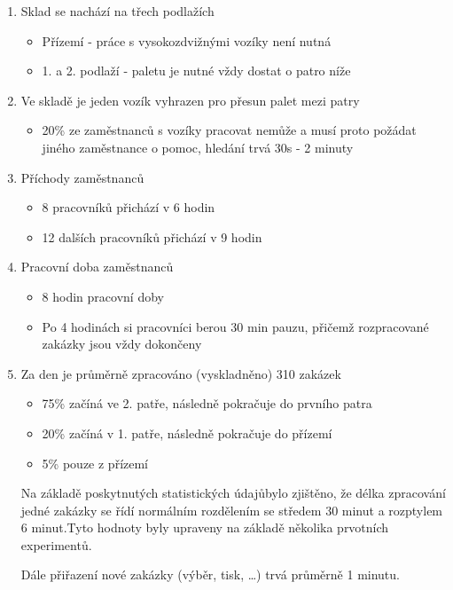 \documentclass[11pt]{article}
\begin{document}
	\begin{enumerate}
		\item Sklad se nachází na třech podlažích\footnotemark[1]
		\begin{itemize}
			\item \textsf{Přízemí} - práce s vysokozdvižnými vozíky není nutná
			\item \textsf{1. a 2. podlaží} - paletu je nutné vždy dostat o patro níže
		\end{itemize}
		\item Ve skladě je jeden vozík vyhrazen pro přesun palet mezi patry\footnotemark[1]
		\begin{itemize}
			\item \textsf{20\%} ze zaměstnanců s vozíky pracovat nemůže a musí proto požádat jiného zaměstnance o pomoc, hledání trvá \textsf{30s - 2 minuty}\footnotemark[1]
		\end{itemize}
		\item Příchody zaměstnanců\footnotemark[2]
		\begin{itemize}
			\item \textsf{8} pracovníků přichází v 6 hodin
			\item \textsf{12} dalších pracovníků přichází v 9 hodin
		\end{itemize}
		\item Pracovní doba zaměstnanců\footnotemark[2]
		\begin{itemize}
			\item \textsf{8 hodin} pracovní doby
			\item Po \textsf{4 hodinách} si pracovníci berou \textsf{30 min} pauzu, přičemž rozpracované zakázky jsou vždy dokončeny
		\end{itemize}
		\item Za den je průměrně zpracováno (vyskladněno) 310 zakázek\footnotemark[2]
		\begin{itemize}
			\item \textsf{75\%} začíná ve 2. patře, následně pokračuje do prvního patra
			\item \textsf{20\%} začíná v 1. patře, následně pokračuje do přízemí
			\item \textsf{5\%} pouze z přízemí
		\end{itemize}
		Na základě poskytnutých statistických údajů\footnotemark[2] bylo zjištěno, že délka zpracování jedné zakázky se řídí normálním rozdělením\cite[str.~93]{ims-prezentace} se středem 30 minut a rozptylem 6 minut.\footnotemark[1]
		Tyto hodnoty byly upraveny na základě několika prvotních experimentů.
		
		Dále přiřazení nové zakázky (výběr, tisk, …) trvá průměrně 1 minutu.\footnotemark[1]
		
	\end{enumerate}
	
\end{document}

